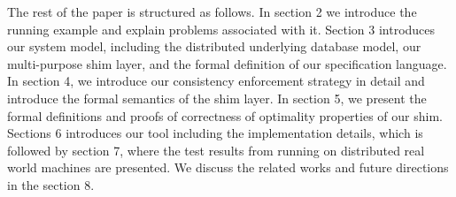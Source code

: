 The rest of the paper is structured as follows. 
In section 2 we introduce the running example and explain problems associated with it. 
Section 3 introduces our system model, including the distributed underlying database model, our 
multi-purpose shim layer, and the formal definition of our specification language.
In section 4, we introduce our consistency enforcement strategy in detail and introduce the 
formal semantics of the shim layer. In section 5, we present the formal definitions 
and proofs of correctness of optimality properties of our shim. Sections 6 introduces our tool 
including 
the implementation details,  
which is followed by section 7, where the test results from running \tool on 
distributed real world machines are presented. 
We discuss the related works and future directions in the section 8. 
